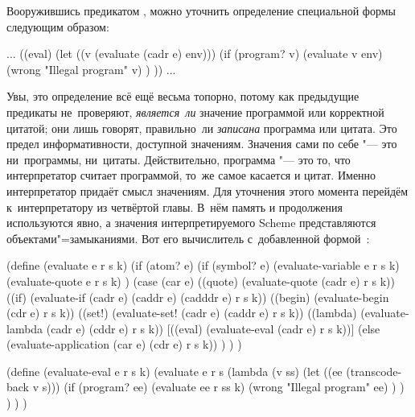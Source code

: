 Вооружившись предикатом , можно уточнить определение специальной
формы~ следующим образом:

\begin{code:lisp}
... ((eval) (let ((v (evaluate (cadr e) env)))
              (if (program? v)
                  (evaluate v env)
                  (wrong "Illegal program" v) ) )) ...
\end{code:lisp}

Увы, это определение всё ещё весьма топорно, потому как предыдущие предикаты
не~проверяют, \emph{является~ли} значение программой или корректной цитатой; они
лишь говорят, правильно~ли \emph{записана} программа или цитата. Это предел
информативности, доступной значениям. Значения сами по себе "--- это
ни~программы, ни~цитаты. Действительно, программа "--- это то, что интерпретатор
считает программой, то~же самое касается и цитат. Именно интерпретатор придаёт
смысл значениям. Для уточнения этого момента перейдём к~интерпретатору из
четвёртой главы.  В~нём память и продолжения
используются явно, а значения интерпретируемого Scheme представляются
объектами"=замыканиями. Вот его вычислитель с~добавленной формой~:

\begin{code:lisp}
(define (evaluate e r s k)
  (if (atom? e)
      (if (symbol? e) (evaluate-variable e r s k)
          (evaluate-quote e r s k) )
      (case (car e)
        ((quote)  (evaluate-quote (cadr e) r s k))
        ((if)     (evaluate-if (cadr e) (caddr e) (cadddr e) r s k))
        ((begin)  (evaluate-begin (cdr e) r s k))
        ((set!)   (evaluate-set! (cadr e) (caddr e) r s k))
        ((lambda) (evaluate-lambda (cadr e) (cddr e) r s k))
        [((eval)   (evaluate-eval (cadr e) r s k))]
        (else     (evaluate-application (car e) (cdr e) r s k)) ) ) )

(define (evaluate-eval e r s k)
  (evaluate e r s
    (lambda (v ss)
      (let ((ee (transcode-back v s)))
        (if (program? ee)
            (evaluate ee r ss k)
            (wrong "Illegal program" ee) ) ) ) ) )
\end{code:lisp}

